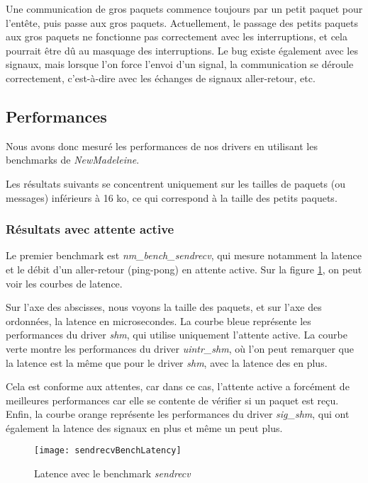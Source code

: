 Une communication de gros paquets commence toujours par un petit paquet pour l'entête, puis passe aux gros paquets.
Actuellement, le passage des petits paquets aux gros paquets ne fonctionne pas correctement avec les interruptions,
et cela pourrait être dû au masquage des interruptions.
Le bug existe également avec les signaux, mais lorsque l'on force l'envoi d'un signal,
la communication se déroule correctement, c'est-à-dire avec les échanges de signaux aller-retour, etc.

\subsection{Performances}

Nous avons donc mesuré les performances de nos drivers en utilisant les benchmarks de \emph{NewMadeleine}.

Les résultats suivants se concentrent uniquement sur les tailles de paquets (ou messages) inférieurs à 16 ko,
ce qui correspond à la taille des petits paquets.

\subsubsection{Résultats avec attente active}

Le premier benchmark est \emph{nm_bench_sendrecv}, qui mesure notamment la latence et le débit d'un aller-retour (ping-pong) en attente active.
Sur la figure \ref{fig:sendrecvBenchLatency}, on peut voir les courbes de latence.

Sur l'axe des abscisses, nous voyons la taille des paquets, et sur l'axe des ordonnées, la latence en microsecondes.
La courbe bleue représente les performances du driver \emph{shm}, qui utilise uniquement l'attente active.
La courbe verte montre les performances du driver \emph{uintr_shm},
où l'on peut remarquer que la latence est la même que pour le driver \emph{shm},
avec la latence des \uintr{} en plus.

Cela est conforme aux attentes, car dans ce cas, l'attente active a forcément de meilleures performances car elle se contente de vérifier si un paquet est reçu.
Enfin, la courbe orange représente les performances du driver \emph{sig_shm}, qui ont également la latence des signaux en plus et même un peut plus.

\begin{figure}[H]
  \texttt{[image: sendrecvBenchLatency]}
  \caption{Latence avec le benchmark \emph{sendrecv}}
  \label{fig:sendrecvBenchLatency}
\end{figure}

